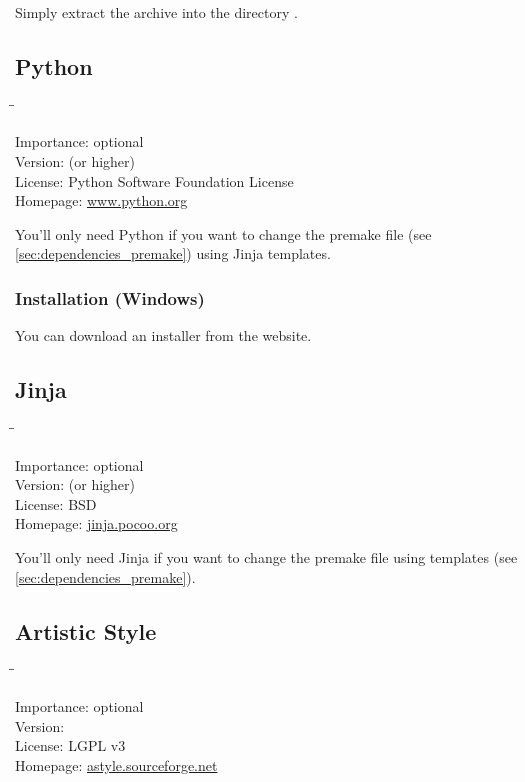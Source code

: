 Simply extract the archive into the directory
.

\subsection{Python}

\begin{tabbing}
  \hspace*{6em}\=\=\kill

  Importance:  \> optional \\
  Version:      (or higher) \\
  License:     \> Python Software Foundation License \\
  Homepage:    \> \href{http://www.python.org/}{www.python.org}
\end{tabbing}

You'll only need Python if you want to change the premake file (see
\ref{sec:dependencies_premake}) using Jinja templates.

\subsubsection{Installation (Windows)}

You can download an installer from the website.

\subsection{Jinja}

\begin{tabbing}
  \hspace*{6em}\=\=\kill

  Importance:  \> optional \\
  Version:      (or higher) \\
  License:     \> BSD \\
  Homepage:    \> \href{http://http://jinja.pocoo.org/}{jinja.pocoo.org}
\end{tabbing}

You'll only need Jinja if you want to change the premake file using
templates (see \ref{sec:dependencies_premake}).

\subsection{Artistic Style}

\begin{tabbing}
  \hspace*{6em}\=\=\kill

  Importance:  \> optional \\
  Version:      \\
  License:     \> LGPL v3 \\
  Homepage:    \> \href{http://astyle.sourceforge.net/}{astyle.sourceforge.net}
\end{tabbing}

